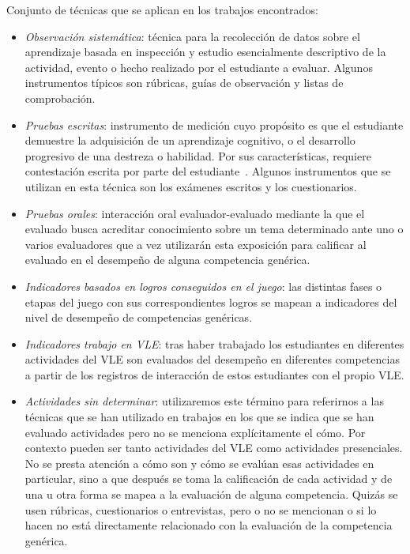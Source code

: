 Conjunto de técnicas que se aplican en los trabajos encontrados:

\begin{itemize}
\item \emph{Observación sistemática}: técnica para la recolección de datos sobre el aprendizaje basada en inspección y estudio esencialmente descriptivo de la actividad, evento o hecho realizado por el estudiante a evaluar.  Algunos instrumentos típicos son rúbricas, guías de observación y listas de comprobación.
\item \emph{Pruebas escritas}: instrumento de medición cuyo propósito es que el estudiante demuestre la adquisición de un aprendizaje cognitivo, o el desarrollo progresivo de una destreza o habilidad. Por sus características, requiere contestación escrita por parte del estudiante~\cite{rojas2008prueba}. Algunos instrumentos que se utilizan en esta técnica son los exámenes escritos y los cuestionarios.
\item \emph{Pruebas orales}: interacción oral evaluador-evaluado mediante la que el evaluado busca acreditar conocimiento sobre un tema determinado ante uno o varios evaluadores que a vez utilizarán esta exposición para calificar al evaluado en el desempeño de alguna competencia genérica. 
\item \emph{Indicadores basados en logros conseguidos en el juego}: las distintas fases o etapas del juego con sus correspondientes logros se mapean a indicadores del nivel de desempeño de competencias genéricas.
\item \emph{Indicadores trabajo en VLE}: tras haber trabajado los estudiantes en diferentes actividades del VLE son evaluados del desempeño en diferentes competencias a partir de los registros de interacción de estos estudiantes con el propio VLE. 
\item \emph{Actividades sin determinar}: utilizaremos este término para referirnos a las técnicas que se han utilizado en trabajos en los que se indica que se han evaluado actividades pero no se menciona explícitamente el cómo. Por contexto pueden ser tanto actividades del VLE como actividades presenciales. No se presta atención a cómo son y cómo se evalúan esas actividades en particular, sino a que después se toma la calificación de cada actividad y de una u otra forma se mapea a la evaluación de alguna competencia. Quizás se usen rúbricas, cuestionarios o entrevistas, pero o no se mencionan o si lo hacen no está directamente relacionado con la evaluación de la competencia genérica.
\end{itemize}

